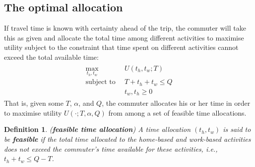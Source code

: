 \documentclass[12pt,a4paper,british]{article}
\newtheorem{definition}{Definition}[section]
\begin{document}
\subsection{The optimal allocation}

If travel time is known with certainty ahead of the trip, the commuter will take this as given and allocate the total time among different activities to maximise utility subject to the constraint that time spent on different activities cannot exceed the total available time:
\begin{align}
\begin{split}
    \max_{t_{h},t_{w}} \, & U\left(t_{h},t_{w};T\right) \\ %
    \mbox{subject to } \, &  T + t_{h} + t_{w} \leq Q \\
                      \, & t_w, t_h \geq 0
\end{split}
\label{eq:maxProb_fixedT}
\end{align}
That is, given some $T$, $\alpha$, and $Q$, the commuter allocates his or her time in order to maximise utility $U\left( \cdot; T, \alpha, Q \right)$ from among a set of feasible time allocations.

\begin{definition}
(\textbf{feasible time allocation}) A time allocation $\left( t_h, t_w \right)$ is said to be \textbf{\textit{feasible}} if the total time allocated to the home-based and work-based activities does not exceed the commuter's time available for these activities, i.e., $t_h + t_w \leq Q - T$.
\end{definition}
\end{document}
